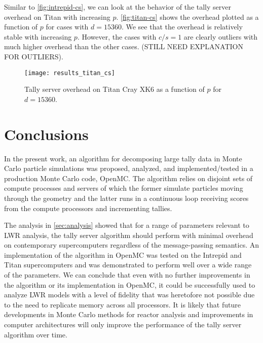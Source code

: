 \documentclass[3p]{elsarticle}
\begin{document}
Similar to \autoref{fig:intrepid-cs}, we can look at the behavior of the tally
server overhead on Titan with increasing $p$. \autoref{fig:titan-cs} shows the
overhead plotted as a function of $p$ for cases with $d = 15360$. We see that
the overhead is relatively stable with increasing $p$. However, the cases with
$c/s = 1$ are clearly outliers with much higher overhead than the other
cases. (STILL NEED EXPLANATION FOR OUTLIERS).

\begin{figure}[!tbh]
  \centering
  \texttt{[image: results\_titan\_cs]}
  \caption{Tally server overhead on Titan Cray XK6 as a function of $p$ for $d =
    15360$.}
  \label{fig:titan-cs}
\end{figure}

\section{Conclusions}

In the present work, an algorithm for decomposing large tally data in Monte
Carlo particle simulations was proposed, analyzed, and implemented/tested in a
production Monte Carlo code, OpenMC. The algorithm relies on disjoint sets of
compute processes and servers of which the former simulate particles moving
through the geometry and the latter runs in a continuous loop receiving scores
from the compute processors and incrementing tallies.

The analysis in \autoref{sec:analysis} showed that for a range of parameters
relevant to LWR analysis, the tally server algorithm should perform with minimal
overhead on contemporary supercomputers regardless of the message-passing
semantics. An implementation of the algorithm in OpenMC was tested on the
Intrepid and Titan supercomputers and was demonstrated to perform well over a
wide range of the parameters. We can conclude that even with no further
improvements in the algorithm or its implementation in OpenMC, it could be
successfully used to analyze LWR models with a level of fidelity that was
heretofore not possible due to the need to replicate memory across all
processors. It is likely that future developments in Monte Carlo methods for
reactor analysis and improvements in computer architectures will only improve
the performance of the tally server algorithm over time.
\end{document}
